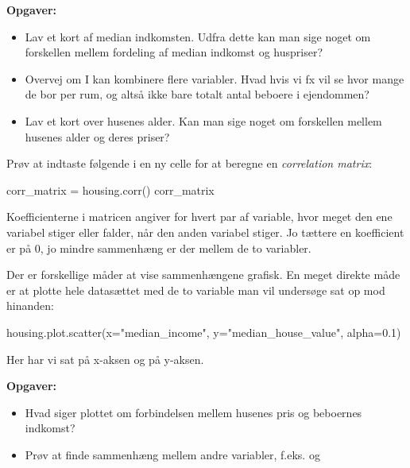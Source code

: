 \documentclass{ucph-handout}
\begin{document}
\begin{exercisebox}[adjusted title=Vis data som landkort]
\textbf{Opgaver:}
\vspace{-3mm}
\begin{itemize}
    \item Lav et kort af median indkomsten. Udfra dette kan man sige noget om forskellen mellem fordeling af median indkomst og huspriser?
    \item Overvej om I kan kombinere flere variabler. Hvad hvis vi fx vil se hvor mange de bor per rum, og altså ikke bare totalt antal beboere i ejendommen?
    \item Lav et kort over husenes alder. Kan man sige noget om forskellen mellem husenes alder og deres priser?
\end{itemize}
\vspace{-4mm}
\end{exercisebox}

\begin{exercisebox}[adjusted title=At finde sammenhænge i data]
Prøv at indtaste følgende i en ny celle for at beregne en \textit{correlation matrix}:
\begin{python}
corr_matrix = housing.corr()
corr_matrix
\end{python}
Koefficienterne i matricen angiver for hvert par af variable, hvor meget den ene variabel stiger eller falder, når den anden variabel stiger. Jo tættere en koefficient er på 0, jo mindre sammenhæng er der mellem de to variabler.

Der er forskellige måder at vise sammenhængene grafisk. En meget direkte måde er at plotte hele datasættet med de to variable man vil undersøge sat op mod hinanden:
\begin{python}
housing.plot.scatter(x="median_income", y="median_house_value", alpha=0.1)
\end{python}
Her har vi sat  på x-aksen og  på y-aksen. \newline

\vspace{-2mm}
\textbf{Opgaver:}
\vspace{-2mm}
\begin{itemize}
    \item Hvad siger plottet om forbindelsen mellem husenes pris og beboernes indkomst?
    \item Prøv at finde sammenhæng mellem andre variabler, f.eks.  og 
\end{itemize}

\end{exercisebox}
\end{document}
